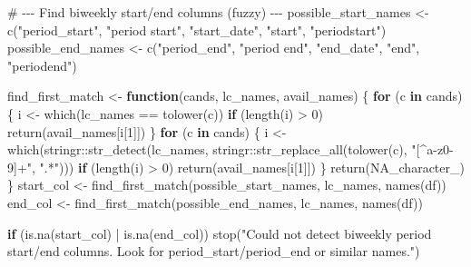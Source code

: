 \documentclass[
  letterpaper,
  DIV=11,
  numbers=noendperiod]{scrartcl}
\newenvironment{Shaded}{\begin{snugshade}}{\end{snugshade}}
\newcommand{\CommentTok}[1]{\textcolor[rgb]{0.37,0.37,0.37}{#1}}
\newcommand{\ConstantTok}[1]{\textcolor[rgb]{0.56,0.35,0.01}{#1}}
\newcommand{\ControlFlowTok}[1]{\textcolor[rgb]{0.00,0.23,0.31}{\textbf{#1}}}
\newcommand{\DecValTok}[1]{\textcolor[rgb]{0.68,0.00,0.00}{#1}}
\newcommand{\FunctionTok}[1]{\textcolor[rgb]{0.28,0.35,0.67}{#1}}
\newcommand{\NormalTok}[1]{\textcolor[rgb]{0.00,0.23,0.31}{#1}}
\newcommand{\OtherTok}[1]{\textcolor[rgb]{0.00,0.23,0.31}{#1}}
\newcommand{\SpecialCharTok}[1]{\textcolor[rgb]{0.37,0.37,0.37}{#1}}
\newcommand{\StringTok}[1]{\textcolor[rgb]{0.13,0.47,0.30}{#1}}
\begin{document}
\begin{Shaded}
\begin{Highlighting}[]
\CommentTok{\# {-}{-}{-} Find biweekly start/end columns (fuzzy) {-}{-}{-}}
\NormalTok{possible\_start\_names }\OtherTok{\textless{}{-}} \FunctionTok{c}\NormalTok{(}\StringTok{"period\_start"}\NormalTok{, }\StringTok{"period start"}\NormalTok{, }\StringTok{"start\_date"}\NormalTok{, }\StringTok{"start"}\NormalTok{, }\StringTok{"periodstart"}\NormalTok{)}
\NormalTok{possible\_end\_names   }\OtherTok{\textless{}{-}} \FunctionTok{c}\NormalTok{(}\StringTok{"period\_end"}\NormalTok{, }\StringTok{"period end"}\NormalTok{, }\StringTok{"end\_date"}\NormalTok{, }\StringTok{"end"}\NormalTok{, }\StringTok{"periodend"}\NormalTok{)}

\NormalTok{find\_first\_match }\OtherTok{\textless{}{-}} \ControlFlowTok{function}\NormalTok{(cands, lc\_names, avail\_names) \{}
  \ControlFlowTok{for}\NormalTok{ (c }\ControlFlowTok{in}\NormalTok{ cands) \{}
\NormalTok{    i }\OtherTok{\textless{}{-}} \FunctionTok{which}\NormalTok{(lc\_names }\SpecialCharTok{==} \FunctionTok{tolower}\NormalTok{(c))}
    \ControlFlowTok{if}\NormalTok{ (}\FunctionTok{length}\NormalTok{(i) }\SpecialCharTok{\textgreater{}} \DecValTok{0}\NormalTok{) }\FunctionTok{return}\NormalTok{(avail\_names[i[}\DecValTok{1}\NormalTok{]])}
\NormalTok{  \}}
  \ControlFlowTok{for}\NormalTok{ (c }\ControlFlowTok{in}\NormalTok{ cands) \{}
\NormalTok{    i }\OtherTok{\textless{}{-}} \FunctionTok{which}\NormalTok{(stringr}\SpecialCharTok{::}\FunctionTok{str\_detect}\NormalTok{(lc\_names, stringr}\SpecialCharTok{::}\FunctionTok{str\_replace\_all}\NormalTok{(}\FunctionTok{tolower}\NormalTok{(c), }\StringTok{"[\^{}a{-}z0{-}9]+"}\NormalTok{, }\StringTok{".*"}\NormalTok{)))}
    \ControlFlowTok{if}\NormalTok{ (}\FunctionTok{length}\NormalTok{(i) }\SpecialCharTok{\textgreater{}} \DecValTok{0}\NormalTok{) }\FunctionTok{return}\NormalTok{(avail\_names[i[}\DecValTok{1}\NormalTok{]])}
\NormalTok{  \}}
  \FunctionTok{return}\NormalTok{(}\ConstantTok{NA\_character\_}\NormalTok{)}
\NormalTok{\}}
\NormalTok{start\_col }\OtherTok{\textless{}{-}} \FunctionTok{find\_first\_match}\NormalTok{(possible\_start\_names, lc\_names, }\FunctionTok{names}\NormalTok{(df))}
\NormalTok{end\_col   }\OtherTok{\textless{}{-}} \FunctionTok{find\_first\_match}\NormalTok{(possible\_end\_names, lc\_names, }\FunctionTok{names}\NormalTok{(df))}

\ControlFlowTok{if}\NormalTok{ (}\FunctionTok{is.na}\NormalTok{(start\_col) }\SpecialCharTok{|} \FunctionTok{is.na}\NormalTok{(end\_col)) }\FunctionTok{stop}\NormalTok{(}\StringTok{"Could not detect biweekly period start/end columns. Look for \textquotesingle{}period\_start\textquotesingle{}/\textquotesingle{}period\_end\textquotesingle{} or similar names."}\NormalTok{)}


\end{Highlighting}
\end{Shaded}
\end{document}
